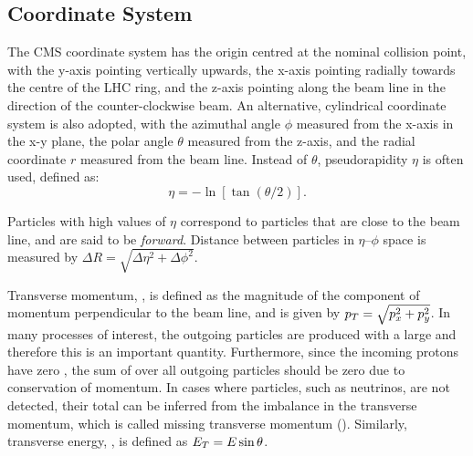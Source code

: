 \subsection{Coordinate System}
The CMS coordinate system has the origin centred at the nominal collision point, with the y-axis pointing vertically upwards, the x-axis pointing radially towards the centre of the LHC ring, and the z-axis pointing along the beam line in the direction of the counter-clockwise beam. An alternative, cylindrical coordinate system is also adopted, with the azimuthal angle $\phi$ measured from the x-axis in the x-y plane, the polar angle $\theta$ measured from the z-axis, and the radial coordinate $r$ measured from the beam line. Instead of $\theta$, pseudorapidity $\eta$ is often used, defined as:  
\begin{equation}
  \eta = -\ln[\tan(\theta/2)].
\end{equation}

Particles with high values of $\eta$ correspond to particles that are close to the beam line, and are said to be \textit{forward}. Distance between particles in $\eta$--$\phi$ space is measured by $\Delta R = \sqrt{\Delta\eta^2 + \Delta\phi^2}$.

Transverse momentum, \pt, is defined as the magnitude of the component of momentum perpendicular to the beam line, and is given by $p_T = \sqrt{p_x^2 + p_y^2}$. In many processes of interest, the outgoing particles are produced with a large \pt and therefore this is an important quantity.  Furthermore, since the incoming protons have zero \pt, the sum of \pt over all outgoing particles should be zero due to conservation of momentum. In cases where particles, such as neutrinos, are not detected, their total \pt can be inferred from the imbalance in the transverse momentum, which is called missing transverse momentum (\ptmiss). Similarly, transverse energy, \ET, is defined as $E_T=E\sin\theta$.